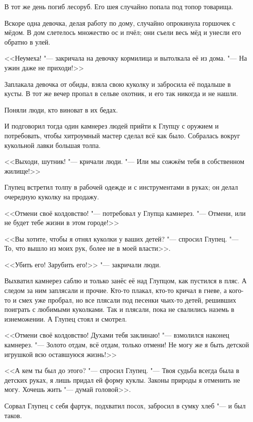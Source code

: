 В тот же день погиб лесоруб.
Его шея случайно попала под топор товарища.

Вскоре одна девочка, делая работу по дому, случайно опрокинула горшочек с мёдом.
В дом слетелось множество ос и пчёл; они съели весь мёд и унесли его обратно в улей.

<<Неумеха! "--- закричала на девочку кормилица и вытолкала её из дома.
"--- На ужин даже не приходи!>>

Заплакала девочка от обиды, взяла свою куколку и забросила её подальше в кусты.
В тот же вечер пропал в сельве охотник, и его так никогда и не нашли.

\spacing

Поняли люди, кто виноват в их бедах.

И подговорил тогда один камнерез людей прийти к Глупцу с оружием и потребовать, чтобы хитроумный мастер сделал всё как было.
Собралась вокруг кукольной лавки большая толпа.

<<Выходи, шутник! "--- кричали люди.
"--- Или мы сожжём тебя в собственном жилище!>>

Глупец встретил толпу в рабочей одежде и с инструментами в руках;
он делал очередную куколку на продажу.

<<Отмени своё колдовство! "--- потребовал у Глупца камнерез.
"--- Отмени, или не будет тебе жизни в этом городе!>>

<<Вы хотите, чтобы я отнял куколки у ваших детей? "--- спросил Глупец.
"--- То, что вышло из моих рук, более не в моей власти>>.

<<Убить его!
Зарубить его!>> "--- закричали люди.

Выхватил камнерез саблю и только занёс её над Глупцом, как пустился в пляс.
А следом за ним заплясали и прочие.
Кто-то плакал, кто-то кричал в гневе, а кого-то и смех уже пробрал, но все плясали под песенки чьих-то детей, решивших поиграть с любимыми куколками.
Так и плясали, пока не свалились наземь в изнеможении.
А Глупец стоял и смотрел.

<<Отмени своё колдовство!
Духами тебя заклинаю! "--- взмолился наконец камнерез.
"--- Золото отдам, всё отдам, только отмени!
Не могу же я быть детской игрушкой всю оставшуюся жизнь!>>

<<А кем ты был до этого? "--- спросил Глупец.
"--- Твоя судьба всегда была в детских руках, я лишь придал ей форму куклы.
Законы природы я отменить не могу.
Хочешь жить "--- думай головой>>.

Сорвал Глупец с себя фартук, подхватил посох, забросил в сумку хлеб "--- и был таков.


